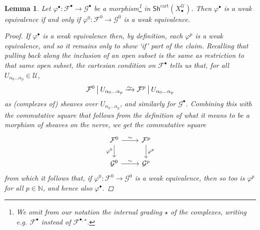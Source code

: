 \documentclass[11pt,fleqn]{article}
\theoremstyle{plain}
\newtheorem{lemma}[theorem]{Lemma}
\theoremstyle{definition}
\theoremstyle{remark}
\numberwithin{equation}{theorem}
\newcommand{\cover}{\mathcal{U}}
\newcommand{\anotherbullet}{\star}
\newcommand{\restricted}{\mathbin{\big\vert}}
\newcommand{\congto}{\xrightarrow{\raisebox{-.5ex}[0ex][0ex]{$\sim$}}}
\newcommand{\cartshX}{\mathsf{Sh}^\mathrm{cart}(X_\bullet^\cover)}
\begin{document}
        \begin{lemma}\label{lemma:weak-equivalences-in-cartshX}
            Let $\varphi^\bullet\colon\mathcal{F}^\bullet\to\mathcal{G}^\bullet$ be a morphism\footnote{We omit from our notation the internal grading $\anotherbullet$ of the complexes, writing e.g. $\mathcal{F}^\bullet$ instead of $\mathcal{F}^{\bullet,\anotherbullet}$.} in $\cartshX$.
            Then $\varphi^\bullet$ is a weak equivalence if and only if $\varphi^0\colon\mathcal{F}^0\to\mathcal{G}^0$ is a weak equivalence.
            \begin{proof}
                If $\varphi^\bullet$ is a weak equivalence then, by definition, each $\varphi^p$ is a weak equivalence, and so it remains only to show `if' part of the claim.
                Recalling that pulling back along the inclusion of an open subset is the same as restriction to that same open subset, the cartesian condition on $\mathcal{F}^\bullet$ tells us that, for all $U_{\alpha_0\ldots\alpha_p}\in\cover$,
                \[
                    \mathcal{F}^0 \restricted U_{\alpha_0\ldots\alpha_p}
                    \congto
                    \mathcal{F}^p \restricted U_{\alpha_0\ldots\alpha_p}
                \]
                as (complexes of) sheaves over $U_{\alpha_0\ldots\alpha_p}$, and similarly for $\mathcal{G}^\bullet$.
                Combining this with the commutative square that follows from the definition of what it means to be a morphism of sheaves on the nerve, we get the commutative square
                \[
                    \begin{tikzcd}
                        \mathcal{F}^0
                            \ar[r,"\sim"]
                            \ar[d,swap,"\varphi^0"]
                       &\mathcal{F}^p
                            \ar[d,"\varphi^p"]
                    \\  \mathcal{G}^0
                            \ar[r,"\sim"]
                       &\mathcal{G}^p
                    \end{tikzcd}
                \]
                from which it follows that, if $\varphi^0\colon\mathcal{F}^0\to\mathcal{G}^0$ is a weak equivalence, then so too is $\varphi^p$ for all $p\in\mathbb{N}$, and hence also $\varphi^\bullet$.
            \end{proof}
        \end{lemma}
\end{document}
